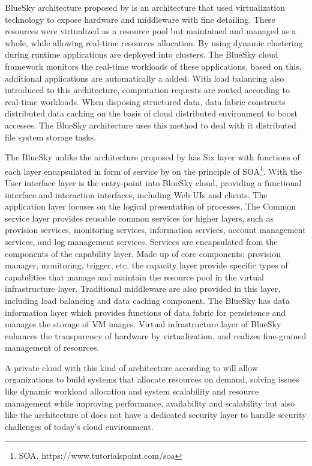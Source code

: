 BlueSky architecture \cite{dong2009bluesky} proposed by \citeauthor{dong2009bluesky} is an architecture that used virtualization technology to expose hardware and middleware with fine detailing. These resources were virtualized as a resource pool but maintained and managed as a whole, while allowing real-time resources allocation. By using dynamic clustering during runtime applications are deployed into clusters. The BlueSky cloud framework monitors the real-time workloads of these applications, based on this, additional applications are automatically a added. With load balancing also introduced to this architecture, computation requests are routed according to real-time workloads. When disposing structured data, data fabric constructs distributed data caching on the basis of cloud distributed environment to boost accesses. The BlueSky architecture uses this method to deal with it distributed file system storage tasks. 

The BlueSky unlike the architecture proposed by \cite{zheng2011design} has Six layer with functions of each layer encapsulated in form of service by on the principle of SOA\footnote{SOA. https://www.tutorialspoint.com/soa}. With the User interface layer is the entry-point into BlueSky cloud, providing a functional interface and interaction interfaces, including Web UIs and clients. The application layer focuses on the logical presentation of processes. The Common service layer provides reusable common services for higher layers, such as provision services, monitoring services, information services, account management services, and log management services. Services are encapsulated from the components of the capability layer. Made up of core components; provision manager, monitoring, trigger, etc, the capacity layer provide specific types of capabilities that manage and maintain the resource pool in the virtual infrastructure layer. Traditional middleware are also provided in this layer, including load balancing and data caching component. The BlueSky has data information layer which provides functions of data fabric for persistence and manages the storage of VM images. Virtual infrastructure layer of BlueSky enhances the transparency of hardware by virtualization, and realizes fine-grained management of resources.

A private cloud with this kind of architecture according to \cite{dong2009bluesky} will allow organizations to build systems that allocate resources on demand, solving issues like dynamic workload allocation and system scalability and resource management while improving performance, availability and scalability but also like the architecture of \cite{zheng2011design} does not have a dedicated security layer to handle security challenges of today's cloud environment. 

